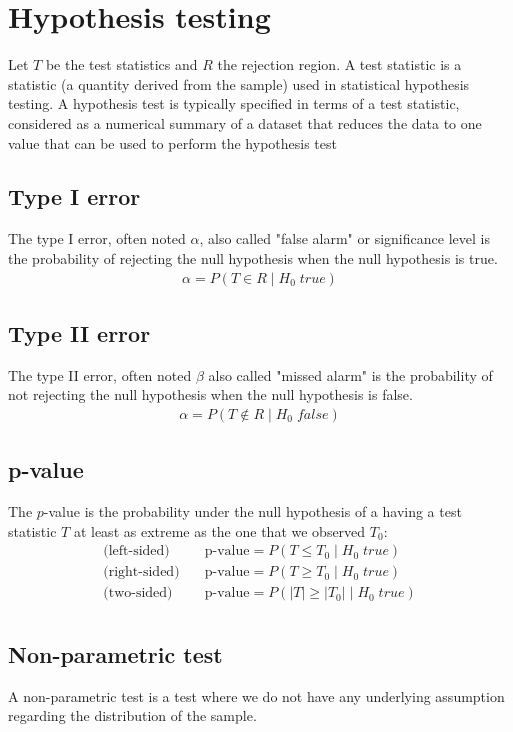 \documentclass[../main.tex]{subfiles}
\begin{document}
\section{Hypothesis testing}
Let $T$ be the test statistics and $R$ the rejection region.
A test statistic is a statistic (a quantity derived from the sample) used in statistical hypothesis testing.
A hypothesis test is typically specified in terms of a test statistic, considered as a numerical summary
of a dataset that reduces the data to one value that can be used to perform the hypothesis test

\subsection{Type I error}
The type I error, often noted $\alpha$, also called "false alarm" or significance level is the probability
of rejecting the null hypothesis when the null hypothesis is true.
\begin{align*}
    \alpha = P(T \in R\; |\; H_0\; true)
\end{align*}

\subsection{Type II error}
The type II error, often noted $\beta$ also called "missed alarm" is the probability
of not rejecting the null hypothesis when the null hypothesis is false.
\begin{align*}
    \alpha = P(T \notin R\; |\; H_0\; false)
\end{align*}

\subsection{p-value}
The $p$-value is the probability under the null hypothesis of a having a test statistic $T$ at
least as extreme as the one that we observed $T_0$:
\begin{align*}
    \text{(left-sided)} \quad & \text{p-value} = P(T \leq T_0\; |\; H_0\; true) \\
    \text{(right-sided)}\quad & \text{p-value} = P(T \geq T_0\; |\; H_0\; true) \\
    \text{(two-sided)}  \quad & \text{p-value} = P(|T| \geq |T_0|\; |\; H_0\; true) \\
\end{align*}

\subsection{Non-parametric test}
A non-parametric test is a test where we do not have any underlying assumption regarding the
distribution of the sample.
\end{document}
